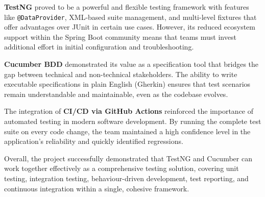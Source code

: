 \documentclass[12pt,a4paper]{article}
\begin{document}
\textbf{TestNG} proved to be a powerful and flexible testing framework with features like \texttt{@DataProvider}, XML-based suite management, and multi-level fixtures that offer advantages over JUnit in certain use cases. However, its reduced ecosystem support within the Spring Boot community means that teams must invest additional effort in initial configuration and troubleshooting.

\textbf{Cucumber BDD} demonstrated its value as a specification tool that bridges the gap between technical and non-technical stakeholders. The ability to write executable specifications in plain English (Gherkin) ensures that test scenarios remain understandable and maintainable, even as the codebase evolves.

The integration of \textbf{CI/CD via GitHub Actions} reinforced the importance of automated testing in modern software development. By running the complete test suite on every code change, the team maintained a high confidence level in the application's reliability and quickly identified regressions.

Overall, the project successfully demonstrated that TestNG and Cucumber can work together effectively as a comprehensive testing solution, covering unit testing, integration testing, behaviour-driven development, test reporting, and continuous integration within a single, cohesive framework.
\end{document}
